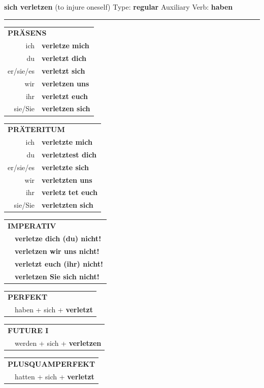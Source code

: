 \documentclass[10pt,a4paper]{revtex4-2}
\begin{document}
\begin{verbbox}
{\Large \bf sich verletzen} (to injure oneself) \hfill Type: \textbf{regular} \hfill Auxiliary Verb: \textbf{haben}

\vspace{5pt}
\hrule
\vspace{5pt}

\begin{tabular}{rl}
\multicolumn{2}{l}{\textbf{PRÄSENS}}\\
ich & \textbf{verletze mich}\\
du & \textbf{verletzt dich}\\
er/sie/es & \textbf{verletzt sich}\\
wir & \textbf{verletzen uns}\\
ihr & \textbf{verletzt euch}\\
sie/Sie & \textbf{verletzen sich}\\
\end{tabular}
\hfill
\begin{tabular}{rl}
\multicolumn{2}{l}{\textbf{PRÄTERITUM}}\\
ich & \textbf{verletzte mich}\\
du & \textbf{verletztest dich}\\
er/sie/es & \textbf{verletzte sich}\\
wir & \textbf{verletzten uns}\\
ihr & \textbf{verletz tet euch}\\
sie/Sie & \textbf{verletzten sich}\\
\end{tabular}
\hfill
\begin{tabular}{rl}
\multicolumn{2}{l}{\textbf{IMPERATIV}}\\
& \textbf{verletze dich (du) nicht!}\\
& \textbf{verletzen wir uns nicht!}\\
& \textbf{verletzt euch (ihr) nicht!}\\
& \textbf{verletzen Sie sich nicht!}\\
\end{tabular}

\vspace{10pt}

\begin{tabular}{rl}
\multicolumn{2}{l}{\textbf{PERFEKT}}\\
& haben + sich + \textbf{verletzt}\\
\end{tabular}
\hfill
\begin{tabular}{rl}
\multicolumn{2}{l}{\textbf{FUTURE I}}\\
& werden + sich + \textbf{verletzen}\\
\end{tabular}
\hfill
\begin{tabular}{rl}
\multicolumn{2}{l}{\textbf{PLUSQUAMPERFEKT}}\\
& hatten + sich + \textbf{verletzt}\\
\end{tabular}


\end{verbbox}
\end{document}
